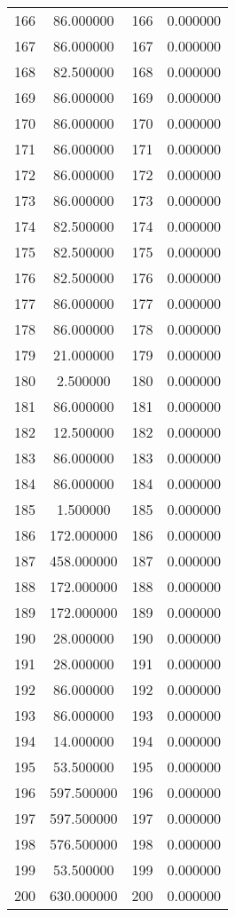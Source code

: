 \documentclass[12pt]{article}
\begin{document}
\begin{longtable}{@{}cccc@{}}
166 & 86.000000 & 166 & 0.000000 \\
167 & 86.000000 & 167 & 0.000000 \\
168 & 82.500000 & 168 & 0.000000 \\
169 & 86.000000 & 169 & 0.000000 \\
170 & 86.000000 & 170 & 0.000000 \\
171 & 86.000000 & 171 & 0.000000 \\
172 & 86.000000 & 172 & 0.000000 \\
173 & 86.000000 & 173 & 0.000000 \\
174 & 82.500000 & 174 & 0.000000 \\
175 & 82.500000 & 175 & 0.000000 \\
176 & 82.500000 & 176 & 0.000000 \\
177 & 86.000000 & 177 & 0.000000 \\
178 & 86.000000 & 178 & 0.000000 \\
179 & 21.000000 & 179 & 0.000000 \\
180 & 2.500000 & 180 & 0.000000 \\
181 & 86.000000 & 181 & 0.000000 \\
182 & 12.500000 & 182 & 0.000000 \\
183 & 86.000000 & 183 & 0.000000 \\
184 & 86.000000 & 184 & 0.000000 \\
185 & 1.500000 & 185 & 0.000000 \\
186 & 172.000000 & 186 & 0.000000 \\
187 & 458.000000 & 187 & 0.000000 \\
188 & 172.000000 & 188 & 0.000000 \\
189 & 172.000000 & 189 & 0.000000 \\
190 & 28.000000 & 190 & 0.000000 \\
191 & 28.000000 & 191 & 0.000000 \\
192 & 86.000000 & 192 & 0.000000 \\
193 & 86.000000 & 193 & 0.000000 \\
194 & 14.000000 & 194 & 0.000000 \\
195 & 53.500000 & 195 & 0.000000 \\
196 & 597.500000 & 196 & 0.000000 \\
197 & 597.500000 & 197 & 0.000000 \\
198 & 576.500000 & 198 & 0.000000 \\
199 & 53.500000 & 199 & 0.000000 \\
200 & 630.000000 & 200 & 0.000000 \\

\end{longtable}
\end{document}
